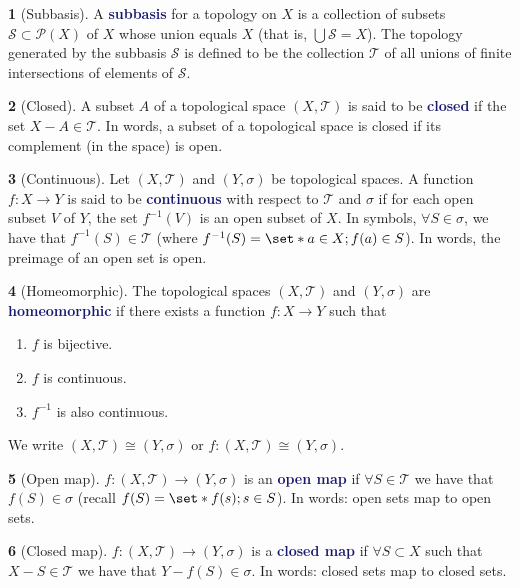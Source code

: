 \documentclass[11pt]{article}
\numberwithin{equation}{section}
\newcommand{\navy}[1]{\textcolor{MidnightBlue}{\bf #1}}
\theoremstyle{plain}
\theoremstyle{definition}
\newtheorem{definition}{\color{MidnightBlue}{\textbf{Definition}}}[section]
\newcommand\inv[1]{#1^{-1}}
\def\Set{\set*}%
\def\ss{\subset}
\newcommand{\1}{\mathbbm 1}
\newcommand{\pP}{\mathcal P}
\newcommand{\tT}{\mathcal T}
\newcommand{\sS}{\mathcal S}
\begin{document}
\begin{definition}[Subbasis]
A \navy{subbasis} for a topology on $X$ is a collection of subsets $\sS \ss \pP(X)$ of $X$ whose union equals $X$ (that is, $\bigcup \sS = X$). The topology generated by the subbasis $\sS$ is defined to be the collection $\tT$ of all unions of finite intersections of elements of $\sS$.
\end{definition}

\begin{definition}[Closed]
A subset $A$ of a topological space $(X,\tT)$ is said to be \navy{closed} if the set $X - A \in \tT$. In words, a subset of a topological space is closed if its complement (in the space) is open.
\end{definition}

\begin{definition}[Continuous]
Let $(X,\tT)$ and $(Y,\sigma)$ be topological spaces. A function $f : X \to Y$ is said to be \navy{continuous} with respect to $\tT$ and $\sigma$ if for each open subset $V$ of $Y$, the set $f^{-1}(V)$ is an open subset of $X$. In symbols, $\forall S \in \sigma$, we have that $\inv{f}(S) \in \tT$ (where $\inv{f}(S) = \Set{a \in X; f(a) \in S}$). In words, the preimage of an open set is open.
\end{definition}

\begin{definition}[Homeomorphic]
The topological spaces $(X,\tT)$ and $(Y,\sigma)$ are \navy{homeomorphic} if there exists a function $f: X \to Y$ such that
\begin{enumerate}
\item $f$ is bijective.
\item $f$ is continuous.
\item $\inv{f}$ is also continuous.
\end{enumerate}
We write $(X,\tT) \cong (Y,\sigma)$ or $f: (X,\tT) \cong (Y,\sigma)$.
\end{definition}

\begin{definition}[Open map]
$f: (X,\tT) \to (Y,\sigma)$ is an \navy{open map} if $\forall S \in \tT$ we have that $f(S) \in \sigma$ (recall $f(S) = \Set{f(s);s \in S}$). In words: open sets map to open sets.
\end{definition}

\begin{definition}[Closed map]
$f: (X,\tT) \to (Y,\sigma)$ is a \navy{closed map} if $\forall S \ss X$ such that $X - S \in \tT$ we have that $Y - f(S) \in \sigma$. In words: closed sets map to closed sets.
\end{definition}
\end{document}
